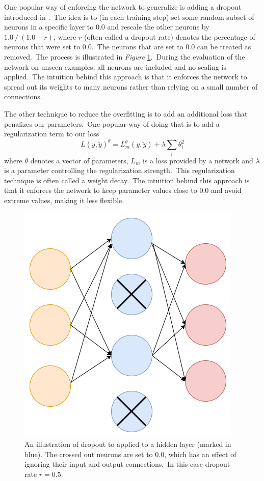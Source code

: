 \documentclass[longabstract, english, mgr]{iithesis}
\theoremstyle{default_theorem_style}\newtheorem{theorem}{Theorem}
\theoremstyle{default_theorem_style}\newtheorem{definition}{Definition}
\begin{document}
\noindent One popular way of enforcing the network to generalize is adding a dropout introduced
in \cite{dropout}.\ The idea is to (in each training step) set some random subset of neurons in a specific layer
to $0.0$ and rescale the other neurons by $1.0\ /\ (1.0 - r)$, where $r$ (often called a dropout rate) denotes
the percentage of neurons that were set to $0.0$.\ The neurons that are set to $0.0$ can be treated as removed.\ The
process is illustrated in \textit{Figure} \ref{fig:dropout}.\ During the evaluation of the network on unseen examples,
all neurons are included and no scaling is applied.\ The intuition behind this approach is that it enforces the
network to spread out its weights to many neurons rather than relying on a small number of connections.\newline

\noindent The other technique to reduce the overfitting is to add an additional loss that penalizes our
parameters.\ One popular way of doing that is to add a regularization term to our loss
$$
L(y, \tilde{y})^{\theta} = L_m^{\theta}(y, \tilde{y}) + \lambda \sum_i \theta_i^2
$$
where $\theta$ denotes a vector of parameters, $L_m$ is a loss provided by a network and $\lambda$ is a parameter
controlling the regularization strength.\ This regularization technique is often called a weight decay.\ The intuition
behind this approach is that it enforces the network to keep parameter values close to $0.0$ and avoid extreme values,
making it less flexible.\newline

\begin{figure}[t]
\centering
\includegraphics[scale=0.42]{dropout}
\caption{An illustration of dropout to applied to a hidden layer (marked in blue). The crossed out neurons are set
to $0.0$, which has an effect of ignoring their input and output connections.\ In this case dropout rate $r = 0.5$.}
\label{fig:dropout}
\end{figure}
\end{document}
